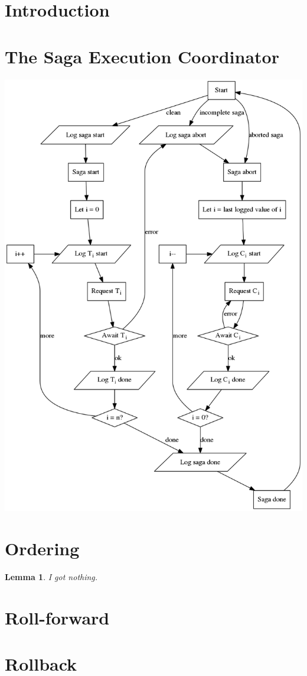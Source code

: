 \documentclass{article}
\newtheorem{lemma}{Lemma}[section]
\begin{document}
\section{Introduction}

\section{The Saga Execution Coordinator}

\includegraphics[width=\linewidth]{flow}

\section{Ordering}

\begin{lemma}
I got nothing.
\end{lemma}

\section{Roll-forward}

\section{Rollback}
\end{document}
